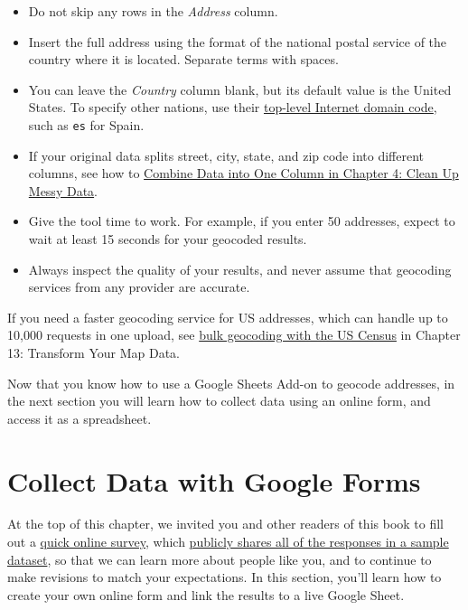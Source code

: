 \documentclass[
  english,
]{book}
\providecommand{\tightlist}{%
  \setlength{\itemsep}{0pt}\setlength{\parskip}{0pt}}
\begin{document}
\begin{itemize}
\tightlist
\item
  Do not skip any rows in the \emph{Address} column.
\item
  Insert the full address using the format of the national postal service of the country where it is located. Separate terms with spaces.
\item
  You can leave the \emph{Country} column blank, but its default value is the United States. To specify other nations, use their \href{https://en.wikipedia.org/wiki/List_of_Internet_top-level_domains}{top-level Internet domain code}, such as \texttt{es} for Spain.
\item
  If your original data splits street, city, state, and zip code into different columns, see how to \href{combine-data.html}{Combine Data into One Column in Chapter 4: Clean Up Messy Data}.
\item
  Give the tool time to work. For example, if you enter 50 addresses, expect to wait at least 15 seconds for your geocoded results.
\item
  Always inspect the quality of your results, and never assume that geocoding services from any provider are accurate.
\end{itemize}

If you need a faster geocoding service for US addresses, which can handle up to 10,000 requests in one upload, see \href{bulk-geocode.html}{bulk geocoding with the US Census} in Chapter 13: Transform Your Map Data.

Now that you know how to use a Google Sheets Add-on to geocode addresses, in the next section you will learn how to collect data using an online form, and access it as a spreadsheet.

\hypertarget{forms}{%
\section*{Collect Data with Google Forms}\label{forms}}

At the top of this chapter, we invited you and other readers of this book to fill out a \href{https://forms.gle/yn5QwTzfQkYcppQn9}{quick online survey}, which \href{https://docs.google.com/spreadsheets/d/1egX_akJccnCSzdk1aaDdtrEGe5HcaTrlOW-Yf6mJ3Uo}{publicly shares all of the responses in a sample dataset}, so that we can learn more about people like you, and to continue to make revisions to match your expectations. In this section, you'll learn how to create your own online form and link the results to a live Google Sheet.
\end{document}
